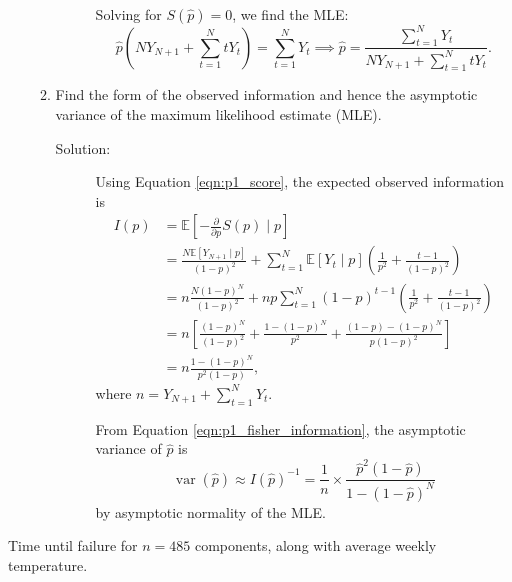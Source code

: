 \documentclass[letterpaper,11pt]{article}
\begin{document}
\begin{enumerate}
\begin{enumerate}
\begin{description}
      Solving for $S\left(\hat{p}\right) = 0$, we find the MLE:
      \begin{equation}
        \hat{p}\left(
          NY_{N+1} + \sum_{t=1}^{N}tY_t
        \right) = \sum_{t=1}^N Y_t
        \implies
        \boxed{
          \hat{p} = \frac{\sum_{t=1}^N Y_t}
          {NY_{N+1} + \sum_{t=1}^{N}tY_t}.
        }
        \label{eqn:p1_mle}
      \end{equation}
    \end{description}
  \item Find the form of the observed information and hence the asymptotic
    variance of the maximum likelihood estimate (MLE).
    \begin{description}
    \item[Solution:] Using Equation \ref{eqn:p1_score}, the expected observed
      information is
      \begin{align}
        I\left(p\right)
        &= \mathbb{E}\left[-\frac{\partial}{\partial p}S\left(p\right) \mid p\right]
          \nonumber\\
        &= \frac{N\mathbb{E}\left[Y_{N+1} \mid p\right]}{(1-p)^2}
          + \sum_{t=1}^N\mathbb{E}\left[Y_t \mid p\right]
          \left(
          \frac{1}{p^2} + \frac{t-1}{\left(1-p\right)^2}
          \right)
          \nonumber \\
        &= n\frac{N\left(1-p\right)^N}{(1-p)^2}
          + np\sum_{t=1}^N
          \left(1 - p\right)^{t-1}
          \left(
          \frac{1}{p^2} + \frac{t-1}{\left(1-p\right)^2}
          \right)
          \nonumber \\
        &= n\left[
          \frac{\left(1-p\right)^N}{(1-p)^2}
          +
          \frac{1 - \left(1 - p\right)^N}{p^2}
          +
          \frac{(1-p) - (1-p)^N}{p(1-p)^2}
          \right] \nonumber \\
        &= \boxed{n\frac{1 - \left(1 - p\right)^N}
          {p^2\left(1 - p\right)},} \label{eqn:p1_fisher_information}
      \end{align}
      where $n = Y_{N+1} + \sum_{t=1}^N Y_t$.

      From Equation \ref{eqn:p1_fisher_information}, the asymptotic variance of
      $\hat{p}$ is
      \begin{equation}
        \operatorname{var}\left(\hat{p}\right)
        \approx
        I\left(\hat{p}\right)^{-1} = \frac{1}{n} \times
        \frac{\hat{p}^2\left(1-\hat{p}\right)}
        {1 - \left(1-\hat{p}\right)^N}
        \label{eqn:p1_variance}
      \end{equation}
      by asymptotic normality of the MLE.
    \end{description}
  \end{enumerate}
\end{enumerate}

\begin{table}
  \centering
  
  \caption{Time until failure for $n = 485$ components, along with average weekly
    temperature.}
  \label{tab:failure_time_data}
\end{table}
\end{document}
